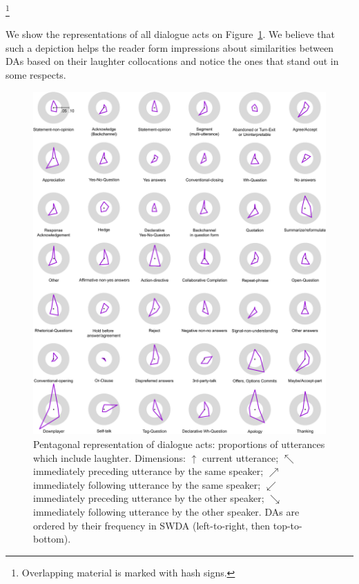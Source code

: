 \documentclass[11pt,a4paper]{article}
\begin{document}
\begin{lingex}%
\item\label{ex:apology-downplayer}\footnote{Overlapping material is marked with hash signs.}
  \small
\end{lingex}

We show the representations of all dialogue acts on
Figure~\ref{fig:da-orbits}. We believe that such a depiction helps
the reader form impressions about similarities  between
DAs based on their laughter collocations and notice the ones
that stand out in some respects.

\begin{figure}[h!]
  \centering
  \includegraphics[width=\linewidth]{img/multiorbit.pdf}
  \caption{Pentagonal representation of dialogue acts: proportions of utterances which include laughter. Dimensions:
$\uparrow$ current utterance;
$\nwarrow$ immediately preceding utterance by the same speaker;
$\nearrow$ immediately following utterance by the same speaker;
$\swarrow$ immediately preceding utterance by the other speaker;
$\searrow$ immediately following utterance by the other speaker.
DAs are ordered by their frequency in SWDA (left-to-right, then top-to-bottom).
    \label{fig:da-orbits}}
\vspace*{-0.5cm}
\end{figure}
\end{document}
